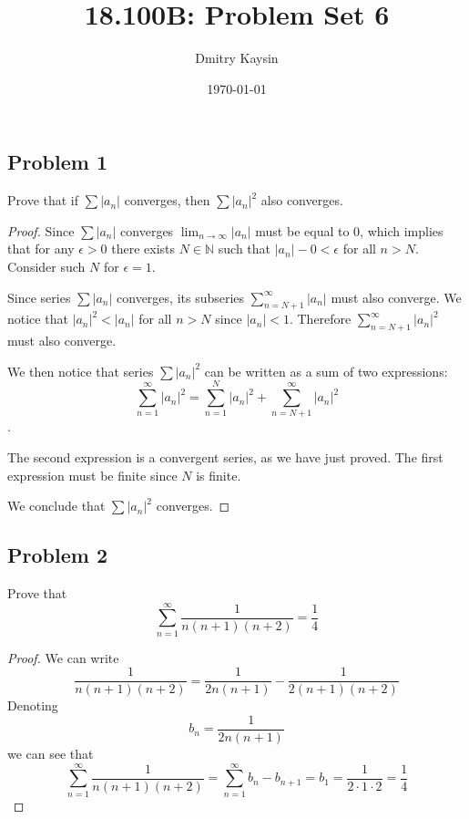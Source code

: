 \documentclass{article}
\title{18.100B: Problem Set 6}
\author{Dmitry Kaysin}
\date\today
\begin{document}
\maketitle 

\subsection*{Problem 1}

\begin{tcolorbox}
Prove that if $\sum |a_n|$ converges, then $\sum |a_n|^2$ also converges.
\end{tcolorbox}

\begin{proof}
Since  $\sum |a_n|$ converges $\lim_{n \to \infty} |a_n|$ must be equal to $0$, which implies that for any $\epsilon>0$ there exists $N \in \mathbb{N}$ such that $|a_n| - 0 < \epsilon$ for all $n > N$. Consider such $N$ for $\epsilon = 1$.

Since series $\sum |a_n|$ converges, its subseries $\sum_{n=N+1}^{\infty}|a_n|$ must also converge. We notice that $|a_n|^2 < |a_n|$ for all $n>N$ since $|a_n| < 1$. Therefore $\sum_{n=N+1}^{\infty}|a_n|^2$ must also converge.

We then notice that series $\sum |a_n|^2$ can be written as a sum of two expressions: 
$$ \sum_{n=1}^{\infty} |a_n|^2 = \sum_{n=1}^{N} |a_n|^2 + \sum_{n=N+1}^{\infty} |a_n|^2 $$.

The second expression is a convergent series, as we have just proved. The first expression must be finite since $N$ is finite.

We conclude that $\sum |a_n|^2$ converges.
\end{proof}

\subsection*{Problem 2}

\begin{tcolorbox}
Prove that 
$$ \sum_{n=1}^{\infty} \frac{1}{n(n+1)(n+2)} = \frac{1}{4} $$
\end{tcolorbox}

\begin{proof}
We can write 
$$ \frac{1}{n(n+1)(n+2)} = \frac{1}{2n(n+1)}-\frac{1}{2(n+1)(n+2)} $$
Denoting 
$$ b_n = \frac{1}{2n(n+1)} $$
we can see that
$$ \sum_{n=1}^{\infty} \frac{1}{n(n+1)(n+2)} =  \sum_{n=1}^{\infty} b_n - b_{n+1} = b_1 = \frac{1}{2 \cdot 1 \cdot 2} = \frac{1}{4} $$
\end{proof}
\end{document}
